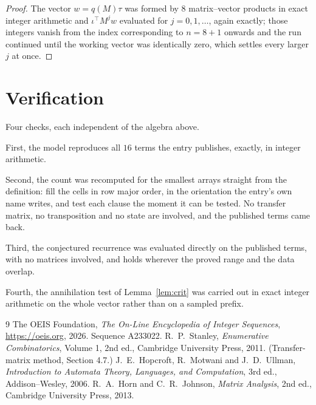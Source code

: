 \documentclass[11pt,a4paper]{article}
\theoremstyle{plain}
\theoremstyle{definition}
\begin{document}
\begin{proof}
The vector $w=q(M)\tau$ was formed by $8$ matrix--vector products in exact integer
arithmetic and $\iota^{\!\top}M^{j}w$ evaluated for $j=0,1,\dots$, again exactly; those
integers vanish from the index corresponding to $n=8+1$ onwards and the run continued
until the working vector was identically zero, which settles every larger $j$ at once.
\end{proof}

\section{Verification}

Four checks, each independent of the algebra above.

First, the model reproduces all $16$ terms the entry publishes, exactly, in integer
arithmetic.

Second, the count was recomputed for the smallest arrays straight from the definition: fill the
cells in row major order, in the orientation the entry's own name writes, and test each clause
the moment it can be tested. No transfer matrix, no transposition and no state are involved,
and the published terms came back.

Third, the conjectured recurrence was evaluated directly on the published terms, with no
matrices involved, and holds wherever the proved range and the data overlap.

Fourth, the annihilation test of Lemma~\ref{lem:crit} was carried out in exact integer
arithmetic on the whole vector rather than on a sampled prefix.

\begin{thebibliography}{9}
 The OEIS Foundation, \emph{The On-Line Encyclopedia of Integer
Sequences}, \url{https://oeis.org}, 2026. Sequence A233022.
 R.~P.~Stanley, \emph{Enumerative Combinatorics}, Volume 1, 2nd ed.,
Cambridge University Press, 2011. (Transfer-matrix method, Section 4.7.)
 J.~E.~Hopcroft, R.~Motwani and J.~D.~Ullman, \emph{Introduction to Automata
Theory, Languages, and Computation}, 3rd ed., Addison--Wesley, 2006.
 R.~A.~Horn and C.~R.~Johnson, \emph{Matrix Analysis}, 2nd ed., Cambridge
University Press, 2013.
\end{thebibliography}
\end{document}
